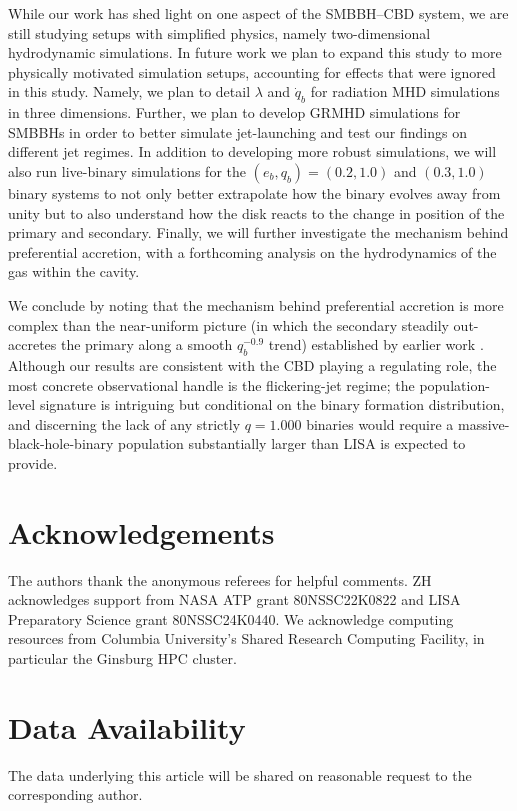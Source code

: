 \documentclass[fleqn,usenatbib]{mnras}
\begin{document}
While our work has shed light on one aspect of the SMBBH--CBD system, we are still studying setups with simplified physics, namely two-dimensional hydrodynamic simulations. In future work we plan to expand this study to more physically motivated simulation setups, accounting for effects that were ignored in this study. Namely, we plan to detail $\lambda$ and $\dot{q}_b$ for radiation MHD simulations in three dimensions. Further, we plan to develop GRMHD simulations for SMBBHs in order to better simulate jet-launching and test our findings on different jet regimes. In addition to developing more robust simulations, we will also run live-binary simulations for the $(e_b, q_b) = (0.2, 1.0)$ and $(0.3, 1.0)$ binary systems to not only better extrapolate how the binary evolves away from unity but to also understand how the disk reacts to the change in position of the primary and secondary. Finally, we will further investigate the mechanism behind preferential accretion, with a forthcoming analysis on the hydrodynamics of the gas within the cavity.

We conclude by noting that the mechanism behind preferential accretion is more complex than the near-uniform picture (in which the secondary steadily out-accretes the primary along a smooth $q_b^{-0.9}$ trend) established by earlier work \citep{farris_2014, duffell_dorazio_2020, siwek_prefacc}. Although our results are consistent with the CBD playing a regulating role, the most concrete observational handle is the flickering-jet regime; the population-level signature is intriguing but conditional on the binary formation distribution, and discerning the lack of any strictly $q = 1.000$ binaries would require a massive-black-hole-binary population substantially larger than LISA is expected to provide.


\section*{Acknowledgements}
The authors thank the anonymous referees for helpful comments. ZH acknowledges support from NASA ATP grant 80NSSC22K0822 and LISA Preparatory Science grant 80NSSC24K0440. We acknowledge computing resources from Columbia University's Shared Research Computing Facility, in particular the Ginsburg HPC cluster.

\section*{Data Availability}
The data underlying this article will be shared on reasonable request to the corresponding author.
\end{document}
